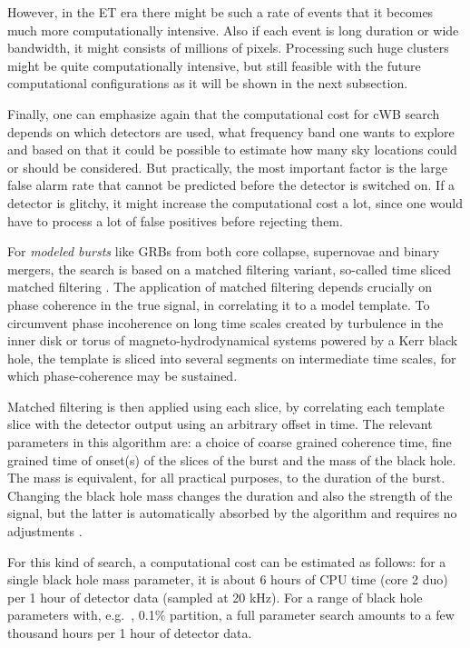 However, in the ET era there might be such a rate of events 
that it becomes much more computationally intensive. Also if each 
event is long duration or wide bandwidth, it might consists of 
millions of pixels. Processing such huge clusters might be quite 
computationally intensive, but still feasible with the future 
computational configurations as it will be shown in the next 
subsection.

Finally, one can emphasize again that the computational cost 
for cWB search depends on which detectors are used, what 
frequency band one wants to explore and based on that it 
could be possible to estimate how many sky locations could 
or should be considered.
But practically, the most important factor is the large false 
alarm rate that cannot be predicted before the detector 
is switched on. If a detector is glitchy, it 
might increase the computational cost a lot, since one would have 
to process a lot of false positives before rejecting them.

For {\em modeled bursts} like GRBs from both core collapse,  
supernovae and binary mergers, the search is based on a 
matched filtering variant, so-called time sliced matched 
filtering \cite{MAURICE2011}.  The application of matched 
filtering depends crucially on phase coherence in the true 
signal, in correlating it to a model template.  To 
circumvent phase incoherence on long time scales created by 
turbulence in the inner disk or torus of magneto-hydrodynamical 
systems powered by a Kerr black hole,   
the template is sliced  into several segments on intermediate 
time scales, for which phase-coherence may be sustained.

Matched filtering is then applied using each slice, by 
correlating each template slice with the detector output 
using an arbitrary offset  in time.
The relevant parameters in this algorithm are: a choice of 
coarse grained coherence time, fine grained time of onset(s) 
of the slices of the burst and the mass of the black hole. 
The mass is equivalent, for all practical purposes, to the 
duration of the burst. Changing the black hole mass changes 
the duration and also the  strength of the signal, but the 
latter is automatically absorbed by the algorithm and requires 
no adjustments \cite{MAURICE2011}.  

For this kind of search, a computational cost can be 
estimated as follows: for a single black hole mass parameter, it is 
about 6 hours of CPU time (core 2 duo) per 1 hour of detector 
data (sampled at 20 kHz). For a range  of black hole parameters 
with, e.g.\ , 0.1$\%$ partition, a full parameter search 
amounts to a few thousand  hours per 1 hour of detector data.

